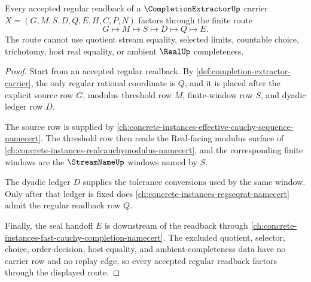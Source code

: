 \begin{theorem}\label{thm:completion-extractor-regular-readback-route}
Every accepted regular readback of a $\CompletionExtractorUp$ carrier $X=(G,M,S,D,Q,E,H,C,P,N)$ factors through the finite route
$$
G \longmapsto M \longmapsto S \longmapsto D \longmapsto Q \longmapsto E .
$$
The route cannot use quotient stream equality, selected limits, countable choice, trichotomy, host real equality, or ambient $\RealUp$ completeness.
\end{theorem}
\begin{proof}
Start from an accepted regular readback. By \autoref{def:completion-extractor-carrier}, the only regular rational coordinate is $Q$, and it is placed after the explicit source row $G$, modulus threshold row $M$, finite-window row $S$, and dyadic ledger row $D$.

The source row is supplied by \autoref{ch:concrete-instances-effective-cauchy-sequence-namecert}. The threshold row then reads the Real-facing modulus surface of \autoref{ch:concrete-instances-realcauchymodulus-namecert}, and the corresponding finite windows are the $\StreamNameUp$ windows named by $S$.

The dyadic ledger $D$ supplies the tolerance conversions used by the same window. Only after that ledger is fixed does \autoref{ch:concrete-instances-regseqrat-namecert} admit the regular readback row $Q$.

Finally, the seal handoff $E$ is downstream of the readback through \autoref{ch:concrete-instances-fast-cauchy-completion-namecert}. The excluded quotient, selector, choice, order-decision, host-equality, and ambient-completeness data have no carrier row and no replay edge, so every accepted regular readback factors through the displayed route.
\end{proof}




